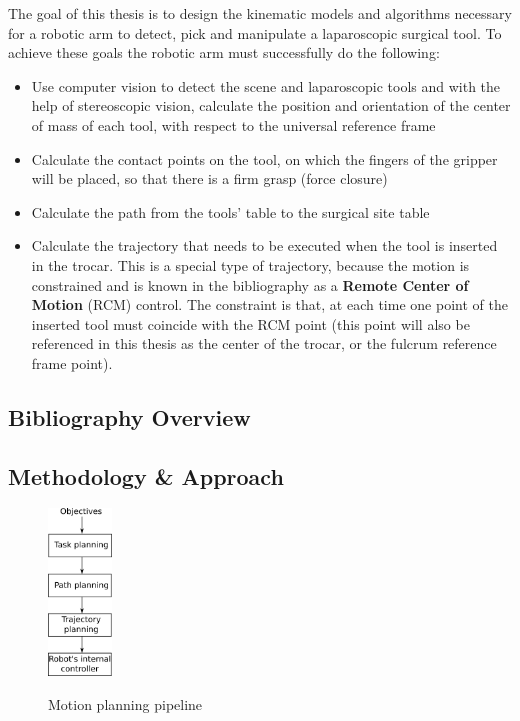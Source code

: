 The goal of this thesis is to design the kinematic models and algorithms necessary for a robotic arm to detect, pick and manipulate a laparoscopic surgical tool. To achieve these goals the robotic arm must 
successfully do the following:
\begin{itemize}
\item Use computer vision to detect the scene and laparoscopic tools and with the help of stereoscopic vision, calculate the position and orientation of the center of mass of each tool, with respect to the 
universal reference frame
\item Calculate the contact points on the tool, on which the fingers of the gripper will be placed, so that there is a firm grasp (force closure)
\item Calculate the path from the tools' table to the surgical site table
\item Calculate the trajectory that needs to be executed when the tool is inserted in the trocar. This is a special type of trajectory, because the motion is constrained and is known in the bibliography as
a \textbf{Remote Center of Motion} (RCM) control. The constraint is that, at each time one point of the inserted tool must coincide with the RCM point (this point will also be referenced in this thesis as the center of the 
trocar, or the fulcrum reference frame point).
\end{itemize}

\subsection{Bibliography Overview}

\subsection{Methodology \& Approach}

\begin{center}
\begin{figure}[H]
\centering
\includegraphics[width=0.15\textwidth]{images/motion-planning.png}\\
\caption{Motion planning pipeline}
\end{figure}
\end{center}

